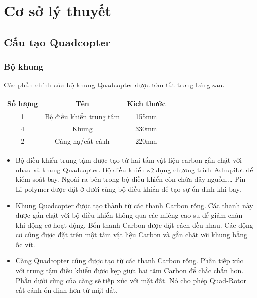 \chapter{Cơ sở lý thuyết} \label{chap:theory}
    \section{Cấu tạo Quadcopter}
    	\subsection{Bộ khung}
Các phần chính của bộ khung Quadcopter được tóm tắt trong bảng sau:
\begin{tabular}{|c|c|c|}
\hline 
Số lượng & Tên & Kích thước \\ 
\hline 
1 & Bộ điều khiển trung tâm & 155mm \\ 
\hline 
4 & Khung & 330mm \\ 
\hline 
2 & Càng hạ/cất cánh & 220mm \\ 
\hline 
\end{tabular}
\begin{itemize}

\item Bộ điều khiển trung tậm được tạo từ hai tấm vật liệu carbon gắn chặt với nhau và khung Quadcopter. Bộ điều khiển sử dụng chương trình Adrupilot để kiểm soát bay. Ngoài ra bên trong bộ điều khiển còn chứa dây nguồn,… Pin Li-polymer được đặt ở dưới cùng bộ điều khiển để tạo sự ổn định khi bay. 

\item Khung Quadcopter được tạo thành từ các thanh Carbon rỗng. Các thanh này được gắn chặt với bộ điều khiển thông qua các miếng cao su để giảm chấn khi động cơ hoạt động. Bốn thanh Carbon được đặt cách đều nhau. Các động cơ cũng được đặt trên một tấm vật liệu Carbon và gắn chặt với khung bằng ốc vít.

\item Càng Quadcopter cũng được tạo từ các thanh Carbon rỗng. Phần tiếp xúc với trung tậm điều khiển được kẹp giữa hai tấm Carbon để chắc chắn hơn. Phần dưới cùng của càng sẽ tiếp xúc với mặt đất. Nó cho phép Quad-Rotor cất cánh ổn định hơn từ mặt đất.
\end{itemize}
